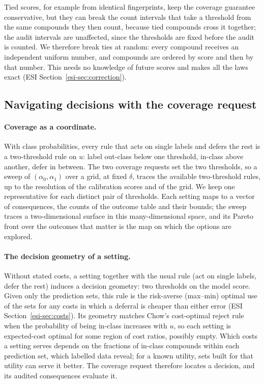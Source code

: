 \documentclass[twocolumn,10pt]{article}
\begin{document}
Tied scores, for example from identical fingerprints, keep the coverage guarantee conservative, but they can break the count intervals that take a threshold from the same compounds they then count, because tied compounds cross it together; the audit intervals are unaffected, since the thresholds are fixed before the audit is counted. We therefore break ties at random: every compound receives an independent uniform number, and compounds are ordered by score and then by that number. This needs no knowledge of future scores and makes all the laws exact (ESI Section~\ref{esi-sec:correction}).

\subsection{Navigating decisions with the coverage request}
\label{sec:methods:choice}

\paragraph{Coverage as a coordinate.} With class probabilities, every rule that acts on single labels and defers the rest is a two-threshold rule on $u$: label out-class below one threshold, in-class above another, defer in between. The two coverage requests set the two thresholds, so a sweep of $(\alpha_0,\alpha_1)$ over a grid, at fixed $\delta$, traces the available two-threshold rules, up to the resolution of the calibration scores and of the grid. We keep one representative for each distinct pair of thresholds. Each setting maps to a vector of consequences, the counts of the outcome table and their bounds; the sweep traces a two-dimensional surface in this many-dimensional space, and its Pareto front over the outcomes that matter is the map on which the options are explored.

\paragraph{The decision geometry of a setting.} Without stated costs, a setting together with the usual rule (act on single labels, defer the rest) induces a decision geometry: two thresholds on the model score. Given only the prediction sets, this rule is the risk-averse (max--min) optimal use of the sets for any costs in which a deferral is cheaper than either error (ESI Section~\ref{esi-sec:costs}).\citep{Kiyani2025RAC} Its geometry matches Chow's cost-optimal reject rule\citep{Chow1970} when the probability of being in-class increases with $u$, so each setting is expected-cost optimal for some region of cost ratios, possibly empty. Which costs a setting serves depends on the fractions of in-class compounds within each prediction set, which labelled data reveal; for a known utility, sets built for that utility can serve it better.\citep{Kiyani2025RAC} The coverage request therefore locates a decision, and its audited consequences evaluate it.
\end{document}
